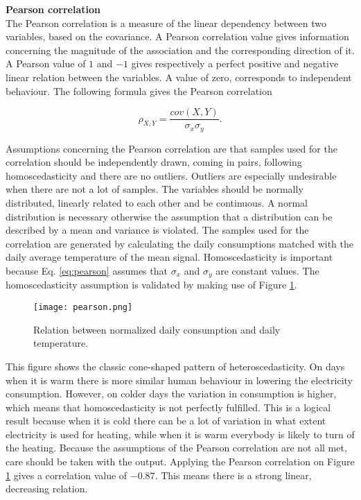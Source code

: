 \textbf{Pearson correlation}\\
The Pearson correlation is a measure of the linear dependency between two variables, based on the covariance. A Pearson correlation value gives information concerning the magnitude of the association and the corresponding direction of it. A Pearson value of $ 1 $ and $ -1 $ gives respectively a perfect positive and negative linear relation between the variables. A value of zero, corresponds to independent behaviour. The following formula gives the Pearson correlation

\begin{equation}\label{eq:pearson}
	\rho_{X,Y} = \frac{cov(X,Y)}{\sigma_x\sigma_y}.
\end{equation}

Assumptions concerning the Pearson correlation are that samples used for the correlation should be independently drawn, coming in pairs, following homoscedasticity and there are no outliers. Outliers are especially undesirable when there are not a lot of samples. The variables should be normally distributed, linearly related to each other and be continuous. A normal distribution is necessary otherwise the assumption that a distribution can be described by a mean and variance is violated. The samples used for the correlation are generated by calculating the daily consumptions matched with the daily average temperature of the mean signal. Homoscedasticity is important because Eq. \ref{eq:pearson} assumes that $ \sigma_x $ and $ \sigma_y $ are constant values. The homoscedasticity assumption is validated by making use of Figure \ref{fig:pearson}.

\begin{figure}[h]
	\centering
	\texttt{[image: pearson.png]}
	\caption{Relation between normalized daily consumption and daily temperature.}
	\label{fig:pearson}
\end{figure}

This figure shows the classic cone-shaped pattern of heteroscedasticity. On days when it is warm there is more similar human behaviour in lowering the electricity consumption. However, on colder days the variation in consumption is higher, which means that homoscedasticity is not perfectly fulfilled. This is a logical result because when it is cold there can be a lot of variation in what extent electricity is used for heating, while when it is warm everybody is likely to turn of the heating. Because the assumptions of the Pearson correlation are not all met, care should be taken with the output. Applying the Pearson correlation on Figure \ref{fig:pearson} gives a correlation value of $ -0.87 $. This means there is a strong linear, decreasing relation.\\


